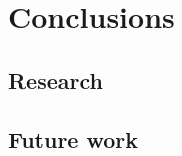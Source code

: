 \documentclass[a4paper,10pt]{article}
\begin{document}
\subsection{}

\subsection{}


\section{Conclusions}
\subsection{Research}

\subsection{}

\subsection{Future work}


\newpage

\end{document}
